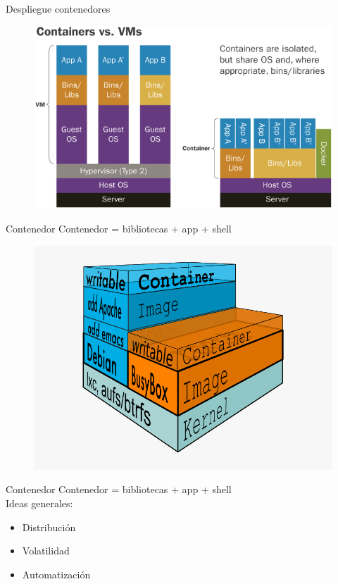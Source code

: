 \documentclass[aspectratio=169]{beamer}
\begin{document}
\begin{frame}{Despliegue contenedores}
    \begin{figure}
        \centering
        \includegraphics[width=0.7\linewidth]{Images/containervsvm.png}
        \label{fig:containervsvm}
    \end{figure}
\end{frame}

\begin{frame}{Contenedor}
    Contenedor = bibliotecas + app + shell
    \begin{figure}
        \centering
        \includegraphics[width=0.6\linewidth]{Images/container.png}
        \label{fig:container}
    \end{figure}
\end{frame}

\begin{frame}{Contenedor}
    Contenedor = bibliotecas + app + shell\\
    
    Ideas generales:
    \begin{itemize}
        \item Distribución
        \item Volatilidad
        \item Automatización
    \end{itemize}
\end{frame}
\end{document}
